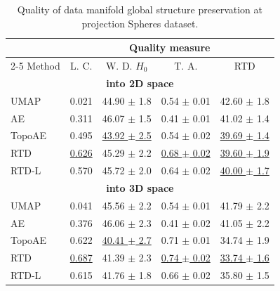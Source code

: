\documentclass[twoside]{article}
\begin{document}
\addtolength{\tabcolsep}{-2.5pt}
\begin{table}
  \caption{Quality of data manifold global structure preservation at projection Spheres dataset.}
  \label{tbl:measure_synthetic3d}
  \centering
  \begin{tabular}{lcccc}
    \toprule
    & \multicolumn{4}{c}{Quality measure}           \\
    \cmidrule(r){2-5}
    Method   & L. C. & W. D. $H_{0}$ & T. A. & RTD \\
    \midrule
    \multicolumn{5}{c}{\textbf{into 2D space}} \\
    UMAP & 0.021 & {44.90 $\pm$ 1.8} & 0.54 $\pm$ 0.01 & 42.60 $\pm$ 1.8 \\
    AE & 0.311 & {46.07 $\pm$ 1.5}  & 0.41 $\pm$ 0.01 & 41.02 $\pm$ 1.4 \\
    TopoAE & {0.495} & \underline{43.92 $\pm$ 2.5} & {0.54 $\pm$ 0.02} & \underline{39.69 $\pm$ 1.4} \\
    RTD & \underline{0.626} & {45.29 $\pm$ 2.2} &\underline{0.68 $\pm$ 0.02}  & \underline{39.60 $\pm$ 1.9}\\
    RTD-L& {0.570} & {45.72 $\pm$ 2.0} & {0.64 $\pm$ 0.02} & \underline{40.00 $\pm$ 1.7} \\
    \midrule
    \multicolumn{5}{c}{\textbf{into 3D space} } \\
    UMAP & 0.041 & 45.56 $\pm$ 2.2 & 0.54 $\pm$ 0.01 & 41.79 $\pm$ 2.2 \\
    AE & 0.376 & {46.06 $\pm$ 2.3} & 0.41 $\pm$ 0.02 & 41.05 $\pm$ 2.2 \\
    TopoAE & {0.622} & \underline{40.41 $\pm$ 2.7} & 0.71 $\pm$ 0.01 & 34.74 $\pm$ 1.9 \\
    RTD & \underline{0.687} & {41.39 $\pm$ 2.3} & \underline{0.74 $\pm$ 0.02} & \underline{33.74 $\pm$ 1.6} \\
    RTD-L & 0.615 & {41.76 $\pm$ 1.8} & 0.66 $\pm$ 0.02 & 35.80 $\pm$ 1.5 \\
    \bottomrule
  \end{tabular}
\end{table}
\addtolength{\tabcolsep}{2pt}
\vspace{-1mm}
\end{document}
